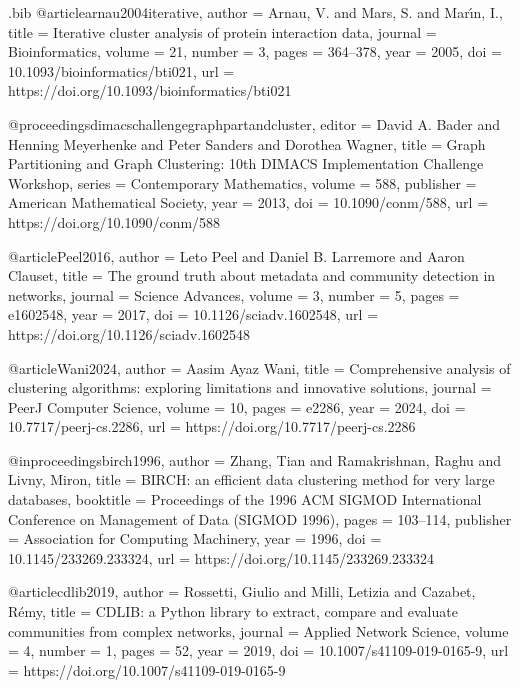 \documentclass[11pt,a4paper]{article}
\begin{document}
\begin{filecontents*}[overwrite]{\jobname.bib}
@article{arnau2004iterative,
  author  = {Arnau, V. and Mars, S. and Mar\'{\i}n, I.},
  title   = {Iterative cluster analysis of protein interaction data},
  journal = {Bioinformatics},
  volume  = {21},
  number  = {3},
  pages   = {364--378},
  year    = {2005},
  doi     = {10.1093/bioinformatics/bti021},
  url     = {https://doi.org/10.1093/bioinformatics/bti021}
}

@proceedings{dimacschallengegraphpartandcluster,
  editor    = {David A. Bader and Henning Meyerhenke and Peter Sanders and Dorothea Wagner},
  title     = {Graph Partitioning and Graph Clustering: 10th {DIMACS} Implementation Challenge Workshop},
  series    = {Contemporary Mathematics},
  volume    = {588},
  publisher = {American Mathematical Society},
  year      = {2013},
  doi       = {10.1090/conm/588},
  url       = {https://doi.org/10.1090/conm/588}
}

@article{Peel2016,
  author  = {Leto Peel and Daniel B. Larremore and Aaron Clauset},
  title   = {The ground truth about metadata and community detection in networks},
  journal = {Science Advances},
  volume  = {3},
  number  = {5},
  pages   = {e1602548},
  year    = {2017},
  doi     = {10.1126/sciadv.1602548},
  url     = {https://doi.org/10.1126/sciadv.1602548}
}

@article{Wani2024,
  author  = {Aasim Ayaz Wani},
  title   = {Comprehensive analysis of clustering algorithms: exploring limitations and innovative solutions},
  journal = {PeerJ Computer Science},
  volume  = {10},
  pages   = {e2286},
  year    = {2024},
  doi     = {10.7717/peerj-cs.2286},
  url     = {https://doi.org/10.7717/peerj-cs.2286}
}

@inproceedings{birch1996,
  author    = {Zhang, Tian and Ramakrishnan, Raghu and Livny, Miron},
  title     = {{BIRCH}: an efficient data clustering method for very large databases},
  booktitle = {Proceedings of the 1996 ACM SIGMOD International Conference on Management of Data (SIGMOD 1996)},
  pages     = {103--114},
  publisher = {Association for Computing Machinery},
  year      = {1996},
  doi       = {10.1145/233269.233324},
  url       = {https://doi.org/10.1145/233269.233324}
}

@article{cdlib2019,
  author  = {Rossetti, Giulio and Milli, Letizia and Cazabet, R{\'e}my},
  title   = {{CDLIB}: a {Python} library to extract, compare and evaluate communities from complex networks},
  journal = {Applied Network Science},
  volume  = {4},
  number  = {1},
  pages   = {52},
  year    = {2019},
  doi     = {10.1007/s41109-019-0165-9},
  url     = {https://doi.org/10.1007/s41109-019-0165-9}
}


\end{filecontents*}
\end{document}
